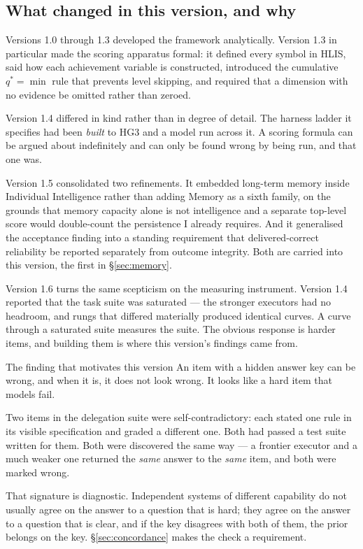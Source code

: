 \documentclass[11pt]{article}
\theoremstyle{definition}
\begin{document}
\subsection{What changed in this version, and why}

Versions 1.0 through 1.3 developed the framework analytically. Version 1.3 in particular made the scoring apparatus formal: it defined every symbol in HLIS, said how each achievement variable is constructed, introduced the cumulative $q^{*}=\min$ rule that prevents level skipping, and required that a dimension with no evidence be omitted rather than zeroed.

Version 1.4 differed in kind rather than in degree of detail. The harness ladder it specifies had been \emph{built} to HG3 and a model run across it. A scoring formula can be argued about indefinitely and can only be found wrong by being run, and that one was.

Version 1.5 consolidated two refinements. It embedded long-term memory inside Individual Intelligence rather than adding Memory as a sixth family, on the grounds that memory capacity alone is not intelligence and a separate top-level score would double-count the persistence I already requires. And it generalised the acceptance finding into a standing requirement that delivered-correct reliability be reported separately from outcome integrity. Both are carried into this version, the first in \S\ref{sec:memory}.

Version 1.6 turns the same scepticism on the measuring instrument. Version 1.4 reported that the task suite was saturated --- the stronger executors had no headroom, and rungs that differed materially produced identical curves. A curve through a saturated suite measures the suite. The obvious response is harder items, and building them is where this version's findings came from.

\begin{cautionbox}{The finding that motivates this version}
An item with a hidden answer key can be wrong, and when it is, it does not look wrong. It looks like a hard item that models fail.

Two items in the delegation suite were self-contradictory: each stated one rule in its visible specification and graded a different one. Both had passed a test suite written for them. Both were discovered the same way --- a frontier executor and a much weaker one returned the \emph{same} answer to the \emph{same} item, and both were marked wrong.

That signature is diagnostic. Independent systems of different capability do not usually agree on the answer to a question that is hard; they agree on the answer to a question that is clear, and if the key disagrees with both of them, the prior belongs on the key. \S\ref{sec:concordance} makes the check a requirement.
\end{cautionbox}
\end{document}
